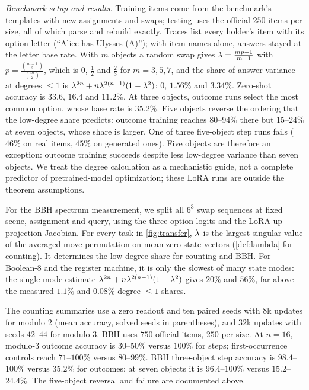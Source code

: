 \noindent\begin{minipage}{\linewidth}
\emph{Benchmark setup and results.} Training items come from the benchmark's templates with new assignments and swaps; testing uses
the official $250$ items per size, all of which parse and rebuild exactly. Traces list every holder's item with its
option letter (``Alice has Ulysses (A)''); with item names alone, answers stayed at the letter base rate. With $m$
objects a random swap gives $\lambda=\frac{mp-1}{m-1}$ with $p=\frac{\binom{m-1}{2}}{\binom{m}{2}}$, which is $0$, $\tfrac{1}{2}$ and $\tfrac{2}{3}$ for $m=3,5,7$, and the
share of answer variance at degrees $\le1$ is $\lambda^{2n}+n\lambda^{2(n-1)}(1-\lambda^2)$: $0$, $1.56\%$ and $3.34\%$. Zero-shot accuracy is
$33.6$, $16.4$ and $11.2\%$. At three objects, outcome runs select the most common option, whose base rate is $35.2\%$.
Five objects reverse the ordering that the low-degree share predicts: outcome training reaches $80$--$94\%$ there but
$15$--$24\%$ at seven objects, whose share is larger. One of three five-object step runs fails ($46\%$ on real items, $45\%$ on
generated ones). Five objects are therefore an exception: outcome training succeeds despite less low-degree variance than seven objects.
We treat the degree calculation as a mechanistic guide, not a complete predictor of pretrained-model optimization; these LoRA runs are outside the theorem assumptions.
\end{minipage}






For the BBH spectrum measurement, we split all $6^3$ swap sequences at fixed scene, assignment and query, using the three option
logits and the LoRA up-projection Jacobian. For every task in \cref{fig:transfer}, $\lambda$ is the largest singular value of the averaged
move permutation on mean-zero state vectors (\cref{def:lambda} for counting).
It determines the low-degree share for counting and BBH. For Boolean-8 and the register machine, it is only the slowest of many state modes:
the single-mode estimate $\lambda^{2n}+n\lambda^{2(n-1)}(1-\lambda^2)$ gives $20\%$ and $56\%$, far above the measured
$1.1\%$ and $0.08\%$ degree-$\le1$ shares.

The counting summaries use a zero readout and ten paired seeds with $8$k updates for modulo $2$ (mean accuracy, solved seeds in parentheses),
and $32$k updates with seeds $42$--$44$ for modulo $3$. BBH uses $750$ official items, $250$ per size. At $n=16$, modulo-$3$
outcome accuracy is $30$--$50\%$ versus $100\%$ for steps; first-occurrence controls
reach $71$--$100\%$ versus $80$--$99\%$. BBH three-object step accuracy is
$98.4$--$100\%$ versus $35.2\%$ for outcomes; at seven objects it is
$96.4$--$100\%$ versus $15.2$--$24.4\%$. The five-object reversal and failure
are documented above.



